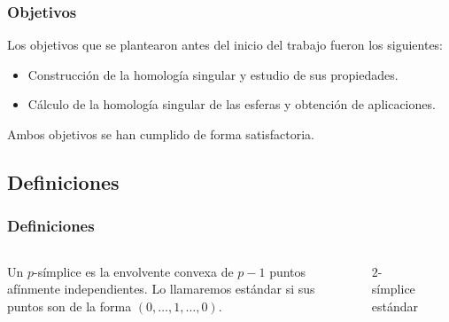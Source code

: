 \documentclass{beamer}
\begin{document}

\begin{frame}
  \frametitle{Objetivos}
  Los objetivos que se plantearon antes del inicio del trabajo fueron los siguientes:
  \begin{itemize}
    \item Construcción de la homología singular y estudio de sus propiedades.
    \item Cálculo de la homología singular de las esferas y obtención de aplicaciones.
  \end{itemize}
  Ambos objetivos se han cumplido de forma satisfactoria.
\end{frame}


\subsection{Definiciones}

\begin{frame}
  \frametitle{Definiciones}
  \begin{columns}[c]

    Un $p$-símplice es la envolvente convexa de $p-1$ puntos afínmente independientes.
    Lo llamaremos estándar si sus puntos son de la forma $(0, \dots, 1, \dots, 0)$.

    \begin{figure}
      \caption{$2$-símplice estándar}
    \end{figure}

  \end{columns}

\end{frame}
\end{document}

